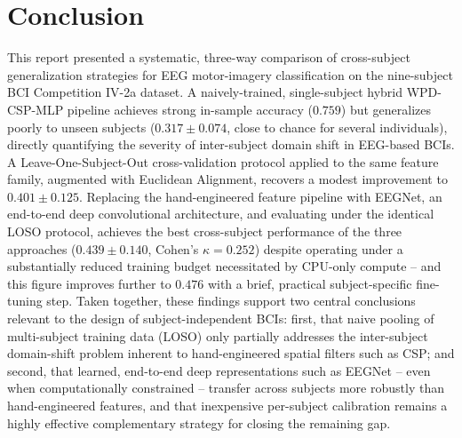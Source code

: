 \documentclass[11pt,a4paper]{article}
\begin{document}
\section{Conclusion}
\label{sec:conclusion}

This report presented a systematic, three-way comparison of cross-subject generalization strategies
for EEG motor-imagery classification on the nine-subject BCI Competition IV-2a dataset. A
naively-trained, single-subject hybrid WPD-CSP-MLP pipeline achieves strong in-sample accuracy
($0.759$) but generalizes poorly to unseen subjects ($0.317 \pm 0.074$, close to chance for several
individuals), directly quantifying the severity of inter-subject domain shift in EEG-based BCIs. A
Leave-One-Subject-Out cross-validation protocol applied to the same feature family, augmented with
Euclidean Alignment, recovers a modest improvement to $0.401 \pm 0.125$. Replacing the hand-engineered
feature pipeline with EEGNet, an end-to-end deep convolutional architecture, and evaluating under the
identical LOSO protocol, achieves the best cross-subject performance of the three approaches
($0.439 \pm 0.140$, Cohen's $\kappa = 0.252$) despite operating under a substantially reduced training
budget necessitated by CPU-only compute -- and this figure improves further to $0.476$ with a brief,
practical subject-specific fine-tuning step. Taken together, these findings support two central
conclusions relevant to the design of subject-independent BCIs: first, that naive pooling of
multi-subject training data (LOSO) only partially addresses the inter-subject domain-shift problem
inherent to hand-engineered spatial filters such as CSP; and second, that learned, end-to-end deep
representations such as EEGNet -- even when computationally constrained -- transfer across subjects
more robustly than hand-engineered features, and that inexpensive per-subject calibration remains a
highly effective complementary strategy for closing the remaining gap.
\end{document}

